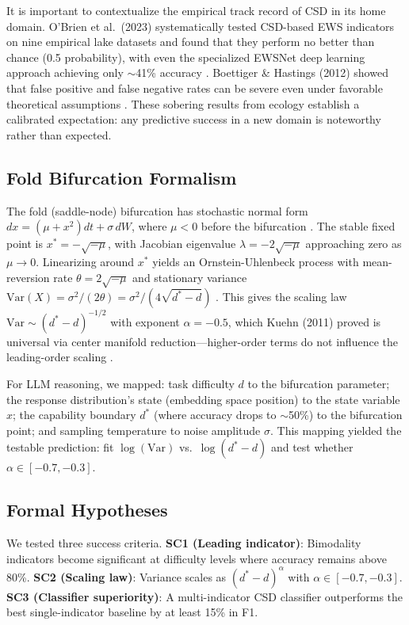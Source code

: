 \documentclass[11pt,letterpaper]{article}
\begin{document}
It is important to contextualize the empirical track record of CSD in its home domain. O'Brien et al.~(2023) systematically tested CSD-based EWS indicators on nine empirical lake datasets and found that they perform no better than chance (0.5 probability), with even the specialized EWSNet deep learning approach achieving only $\sim$41\% accuracy \cite{obrien2023}. Boettiger \& Hastings (2012) showed that false positive and false negative rates can be severe even under favorable theoretical assumptions \cite{boettiger2012}. These sobering results from ecology establish a calibrated expectation: any predictive success in a new domain is noteworthy rather than expected.

\subsection{Fold Bifurcation Formalism}

The fold (saddle-node) bifurcation has stochastic normal form $dx = (\mu + x^2)dt + \sigma\,dW$, where $\mu < 0$ before the bifurcation \cite{kuehn2011}. The stable fixed point is $x^* = -\sqrt{-\mu}$, with Jacobian eigenvalue $\lambda = -2\sqrt{-\mu}$ approaching zero as $\mu \to 0$. Linearizing around $x^*$ yields an Ornstein-Uhlenbeck process with mean-reversion rate $\theta = 2\sqrt{-\mu}$ and stationary variance $\text{Var}(X) = \sigma^2/(2\theta) = \sigma^2/(4\sqrt{d^*-d})$ \cite{kuehn2011}. This gives the scaling law $\text{Var} \sim (d^*-d)^{-1/2}$ with exponent $\alpha = -0.5$, which Kuehn (2011) proved is universal via center manifold reduction---higher-order terms do not influence the leading-order scaling \cite{kuehn2011}.

For LLM reasoning, we mapped: task difficulty $d$ to the bifurcation parameter; the response distribution's state (embedding space position) to the state variable $x$; the capability boundary $d^*$ (where accuracy drops to $\sim$50\%) to the bifurcation point; and sampling temperature to noise amplitude $\sigma$. This mapping yielded the testable prediction: fit $\log(\text{Var})$ vs.\ $\log(d^* - d)$ and test whether $\alpha \in [-0.7, -0.3]$.

\subsection{Formal Hypotheses}

We tested three success criteria. \textbf{SC1 (Leading indicator)}: Bimodality indicators become significant at difficulty levels where accuracy remains above 80\%. \textbf{SC2 (Scaling law)}: Variance scales as $(d^* - d)^{\alpha}$ with $\alpha \in [-0.7, -0.3]$. \textbf{SC3 (Classifier superiority)}: A multi-indicator CSD classifier outperforms the best single-indicator baseline by at least 15\% in F1.
\end{document}
